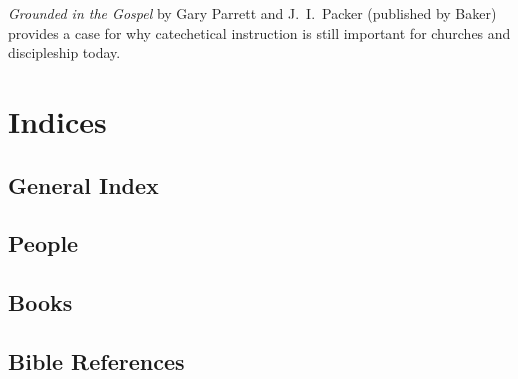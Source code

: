 \documentclass[titlepage]{memoir}
\begin{document}
\emph{Grounded in the Gospel}\/ by Gary Parrett and J.~I.\ Packer (published by Baker) provides a case for why catechetical instruction is still important for churches and discipleship today.


\backmatter

\chapter{Indices}

\section{General Index}
\vspace{-3em}\renewcommand\indexname{}
\printindex

\section{People}

\vspace{-3em}\renewcommand\indexname{}
\printindex[people]

\section{Books}

\vspace{-3em}\renewcommand\indexname{}
\printindex[book]

\section{Bible References}

\printindex[gen]

\printindex[exo]

\printindex[lev]

\printindex[num]

\printindex[deu]

\printindex[jos]

\printindex[jdg]

\printindex[rut]

\printindex[1sa]

\printindex[2sa]

\printindex[1ki]

\printindex[2ki]
\end{document}
